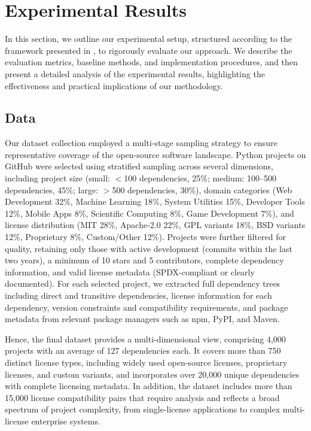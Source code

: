 \vspace{-.1cm}
\section{Experimental Results}
\label{Section:Result}

In this section, we outline our experimental setup, structured according to the framework presented in \cite{LwakatareRCBO20}, to rigorously evaluate our approach. We describe the evaluation metrics, baseline methods, and implementation procedures, and then present a detailed analysis of the experimental results, highlighting the effectiveness and practical implications of our methodology.

\subsection{Data}

Our dataset collection employed a multi-stage sampling strategy to ensure representative coverage of the open-source software landscape. Python projects on GitHub were selected using stratified sampling across several dimensions, including project size (small: $<$100 dependencies, 25\%; medium: 100–500 dependencies, 45\%; large: $>$500 dependencies, 30\%), domain categories (Web Development 32\%, Machine Learning 18\%, System Utilities 15\%, Developer Tools 12\%, Mobile Apps 8\%, Scientific Computing 8\%, Game Development 7\%), and license distribution (MIT 28\%, Apache‑2.0 22\%, GPL variants 18\%, BSD variants 12\%, Proprietary 8\%, Custom/Other 12\%). Projects were further filtered for quality, retaining only those with active development (commits within the last two years), a minimum of 10 stars and 5 contributors, complete dependency information, and valid license metadata (SPDX-compliant or clearly documented). For each selected project, we extracted full dependency trees including direct and transitive dependencies, license information for each dependency, version constraints and compatibility requirements, and package metadata from relevant package managers such as npm, PyPI, and Maven.

Hence, the final dataset provides a multi-dimensional view, comprising 4,000 projects with an average of 127 dependencies each. 
It covers more than 750 distinct license types, including widely used open-source licenses, proprietary licenses, and custom variants, and incorporates over 20,000 unique dependencies with complete licensing metadata. In addition, the dataset includes more than 15,000 license compatibility pairs that require analysis and reflects a broad spectrum of project complexity, from single-license applications to complex multi-license enterprise systems.

